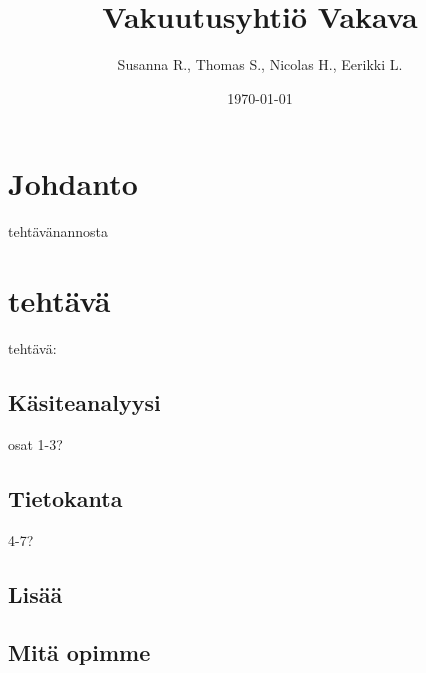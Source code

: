 \documentclass[a4paper, 10pt]{article}
\title{Vakuutusyhtiö Vakava}%
\author{Susanna R., Thomas S., Nicolas H., Eerikki L.}%
\date{\today}%
\begin{document}
 \maketitle
	\section*{Johdanto}tehtävänannosta
	\section*{tehtävä}tehtävä:
	 \subsection*{Käsiteanalyysi}osat 1-3?
	 \subsection*{Tietokanta}4-7?
	 \subsection*{Lisää}
	 \subsection*{Mitä opimme}
 
\end{document}
